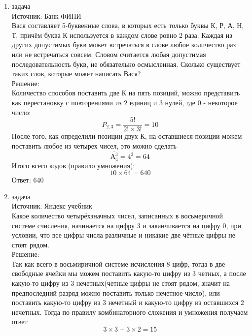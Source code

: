 \documentclass[a4paper,14pt]{extreport} %
\begin{document}
\begin{center}
\begin{enumerate}
						 \item {\large задача  }\\
						 Источник: Банк ФИПИ\\
						 \vspace{15pt}
						 Вася составляет 5-буквенные слова, в которых есть только буквы К, Р, А, Н, Т,  причём буква К используется в каждом слове ровно 2 раза. Каждая из других допустимых букв может встречаться в слове любое количество раз или не встречаться совсем. Словом считается любая допустимая последовательность букв, не обязательно осмысленная. Сколько существует таких слов, которые может написать Вася?
						 \\
						 \vspace{15pt}
						 Решение:\\
						 Количество способов поставить две К на пять позиций, можно представить как перестановку с повторениями из 2 единиц и 3 нулей, где 0 - некоторое число:
						 \begin{equation}
						 	P_{2,3} = \frac{5!}{2! \times 3!} = 10
						 \end{equation}
						 После того, как определили позиции двух К, на оставшиеся позиции можем поставить любое из четырех чисел, это можно сделать
						 \begin{equation}
						 	\overline{А_{4}^3} = 4^3 = 64
						 \end{equation}
						 Итого всего кодов (правило умножения):
						 \begin{equation}
						 	10 \times 64 = 640
						 \end{equation}
						 Ответ: 640
						 
						 
						 
						 \item {\large задача  }\\
						 Источник: Яндекс учебник\\
						 \vspace{15pt}
						 Какое количество четырёхзначных чисел, записанных в восьмеричной системе счисления, начинается на цифру 3 и заканчивается на цифру 0, при условии, что все цифры числа различные и никакие две чётные цифры не стоят рядом.
						 \\
						 \vspace{15pt}
						 Решение:\\
						 Так как всего в восьмиричной системе исчисления 8 цифр, тогда в две свободные ячейки мы можем поставить какую-то цифру из 3 четных, а после какую-то цифру из 3 нечетных(четные цифры не стоят рядом, значит на предпоследний разряд можно поставить только нечетное число), или поставить какую-то цифру из 3 нечетный и какую-то цифру из оставшихся 2 нечетных.
						 Тогда по правилу комбинаторного сложения и умножения получаем ответ
						 \begin{equation}
						 	3\times3 + 3\times2 = 15
						 \end{equation}
						 

\end{enumerate}
\end{center}
\end{document}
